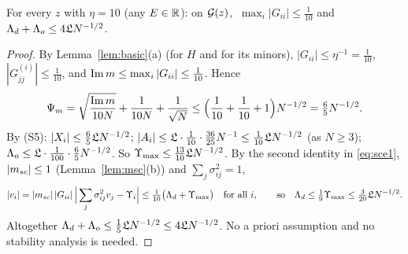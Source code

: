 \begin{lemma}\label{lem:initial}
For every $z$ with $\eta=10$ (any $E\in\mathbb{R}$): on $\mathcal{G}(z)$, $\ \max_i|G_{ii}|\le\frac1{10}$ and $\Lambda_d+\Lambda_o\le4\mathfrak{L} N^{-1/2}$.
\end{lemma}
\begin{proof}
By Lemma~\ref{lem:basic}(a) (for $H$ and for its minors), $|G_{ii}|\le\eta^{-1}=\frac1{10}$, $|G^{(i)}_{jj}|\le\frac1{10}$, and $\operatorname{Im} m\le\max_i|G_{ii}|\le\frac1{10}$. Hence
\[
 \Psi_m=\sqrt{\frac{\operatorname{Im} m}{10N}}+\frac1{10N}+\frac1{\sqrt N}\le\Big(\frac1{10}+\frac1{10}+1\Big)N^{-1/2}=\tfrac65N^{-1/2}.
\]
By (S5): $|X_i|\le\frac65\mathfrak{L} N^{-1/2}$; $|A_i|\le\mathfrak{L}\cdot\frac1{10}\cdot\frac{36}{25}N^{-1}\le\frac1{10}\mathfrak{L} N^{-1/2}$ (as $N\ge3$); $\Lambda_o\le\mathfrak{L}\cdot\frac1{100}\cdot\frac65N^{-1/2}$. So $\Upsilon_{\max}\le\frac{13}{10}\mathfrak{L} N^{-1/2}$.
By the second identity in \eqref{eq:sce1}, $|m_{sc}|\le1$ (Lemma~\ref{lem:msc}(b)) and $\sum_j\sigma_{ij}^2=1$,
\[
 |v_i|=|m_{sc}|\,|G_{ii}|\,\Big|\sum_j\sigma_{ij}^2v_j-\Upsilon_i\Big|\le\tfrac1{10}\big(\Lambda_d+\Upsilon_{\max}\big)\quad\text{for all }i,\qquad\text{so}\quad\Lambda_d\le\tfrac19\Upsilon_{\max}\le\tfrac3{20}\mathfrak{L} N^{-1/2}.
\]
Altogether $\Lambda_d+\Lambda_o\le\frac15\mathfrak{L} N^{-1/2}\le4\mathfrak{L} N^{-1/2}$. No a priori assumption and no stability analysis is needed.
\end{proof}

